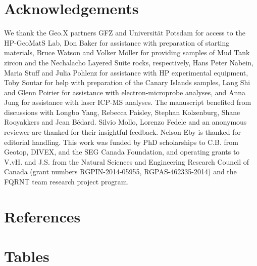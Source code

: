 \documentclass[review,authoryear,12pt]{elsarticle}
\begin{document}

\section*{Acknowledgements} 
We thank the Geo.X partners GFZ and Universit\"at Potsdam for access to the HP-GeoMatS Lab, Don Baker for assistance with preparation of starting materials, Bruce Watson and Volker M\"oller for providing samples of Mud Tank zircon and the Nechalacho Layered Suite rocks, respectively, Hans Peter Nabein, Maria Stuff and Julia Pohlenz for assistance with HP experimental equipment, Toby Soutar for help with preparation of the Canary Islands samples, Lang Shi and Glenn Poirier for assistance with electron-microprobe analyses, and Anna Jung for assistance with laser ICP-MS analyses. The manuscript benefited from discussions with Longbo Yang, Rebecca Paisley, Stephan Kolzenburg, Shane Rooyakkers and Jean B\'edard. Silvio Mollo, Lorenzo Fedele and an anonymous reviewer are thanked for their insightful feedback. Nelson Eby is thanked for editorial handling.
	This work was funded by PhD scholarships to C.B. from Geotop, DIVEX, and the SEG Canada Foundation, and operating grants to V.vH. and J.S. from the Natural Sciences and Engineering Research Council of Canada (grant numbers RGPIN-2014-05955, RGPAS-462335-2014) and the FQRNT team research project program.%
 
\section*{References}
%





\clearpage
\onecolumn
\section{Tables}
\end{document}
